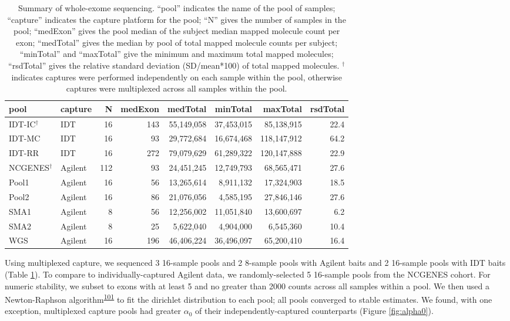 \documentclass[11pt,letterpaper,oneside]{book}
\begin{document}
\begin{table}

\caption[Summary of whole-exome sequencing for CNV project.]{\label{tab:poolSummary}Summary of whole-exome sequencing. ``pool'' indicates the name of the pool of samples; ``capture'' indicates the capture platform for the pool; ``N'' gives the number of samples in the pool; ``medExon'' gives the pool median of the subject median mapped molecule count per exon; ``medTotal'' gives the median by pool of total mapped molecule counts per subject; ``minTotal'' and ``maxTotal'' give the minimum and maximum total mapped molecules; ``rsdTotal'' gives the relative standard deviation (SD/mean*100) of total mapped molecules. \(^\dagger\) indicates captures were performed independently on each sample within the pool, otherwise captures were multiplexed across all samples within the pool.}
\centering
\begin{tabular}[t]{llrrrrrr}
\toprule
pool & capture & N & medExon & medTotal & minTotal & maxTotal & rsdTotal\\
\midrule
IDT-IC$^\dagger$ & IDT & 16 & 143 & 55,149,058 & 37,453,015 & 85,138,915 & 22.4\\
IDT-MC & IDT & 16 & 93 & 29,772,684 & 16,674,468 & 118,147,912 & 64.2\\
IDT-RR & IDT & 16 & 272 & 79,079,629 & 61,289,322 & 120,147,888 & 22.9\\
NCGENES$^\dagger$ & Agilent & 112 & 93 & 24,451,245 & 12,749,793 & 68,565,471 & 27.6\\
Pool1 & Agilent & 16 & 56 & 13,265,614 & 8,911,132 & 17,324,903 & 18.5\\
\addlinespace
Pool2 & Agilent & 16 & 86 & 21,076,056 & 4,585,195 & 27,846,146 & 27.6\\
SMA1 & Agilent & 8 & 56 & 12,256,002 & 11,051,840 & 13,600,697 & 6.2\\
SMA2 & Agilent & 8 & 25 & 5,622,040 & 4,904,000 & 6,545,360 & 10.4\\
WGS & Agilent & 16 & 196 & 46,406,224 & 36,496,097 & 65,200,410 & 16.4\\
\bottomrule
\end{tabular}
\end{table}

Using multiplexed capture, we sequenced 3 16-sample pools and 2 8-sample pools with Agilent baits and 2 16-sample pools with IDT baits (Table \ref{tab:poolSummary}).
To compare to individually-captured Agilent data, we randomly-selected 5 16-sample pools from the NCGENES cohort.
For numeric stability, we subset to exons with at least 5 and no greater than 2000 counts across all samples within a pool.
We then used a Newton-Raphson algorithm\textsuperscript{\protect\hyperlink{ref-minka:2000aa}{101}} to fit the dirichlet distribution to each pool; all pools converged to stable estimates.
We found, with one exception, multiplexed capture pools had greater \(\alpha_0\) of their independently-captured counterparts (Figure \ref{fig:alpha0}).
\end{document}
